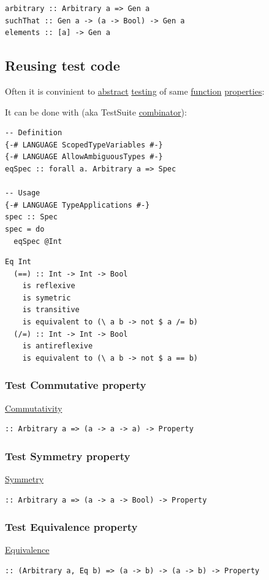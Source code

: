 \documentclass[a4paper,14pt,oneside]{book}
\begin{document}
\begin{verbatim}
arbitrary :: Arbitrary a => Gen a
suchThat :: Gen a -> (a -> Bool) -> Gen a
elements :: [a] -> Gen a
\end{verbatim}

\subsection{\label{org5f5dd20}Reusing test code}
\label{sec:orgfed5e88}
Often it is convinient to \hyperref[org2d9e9ac]{abstract} \hyperref[org526fbf9]{testing} of same \hyperref[orgba4b145]{function} \hyperref[org0be48bd]{properties}:

It can be done with (aka TestSuite \hyperref[orgd7d907c]{combinator}):
\begin{verbatim}
-- Definition
{-# LANGUAGE ScopedTypeVariables #-}
{-# LANGUAGE AllowAmbiguousTypes #-}
eqSpec :: forall a. Arbitrary a => Spec

-- Usage
{-# LANGUAGE TypeApplications #-}
spec :: Spec
spec = do
  eqSpec @Int
\end{verbatim}

\begin{verbatim}
Eq Int
  (==) :: Int -> Int -> Bool
    is reflexive
    is symetric
    is transitive
    is equivalent to (\ a b -> not $ a /= b)
  (/=) :: Int -> Int -> Bool
    is antireflexive
    is equivalent to (\ a b -> not $ a == b)
\end{verbatim}

\subsubsection{\label{orgfe08311}Test Commutative property}
\label{sec:org5933d83}
\hyperref[orgde4e642]{Commutativity}
\begin{verbatim}
:: Arbitrary a => (a -> a -> a) -> Property
\end{verbatim}

\subsubsection{\label{org248036d}Test Symmetry property}
\label{sec:org56cdde2}
\hyperref[orgb77e28b]{Symmetry}
\begin{verbatim}
:: Arbitrary a => (a -> a -> Bool) -> Property
\end{verbatim}

\subsubsection{\label{org0baa3fc}Test Equivalence property}
\label{sec:orga534cb2}
\hyperref[orgcbf1d90]{Equivalence}
\begin{verbatim}
:: (Arbitrary a, Eq b) => (a -> b) -> (a -> b) -> Property
\end{verbatim}
\end{document}

